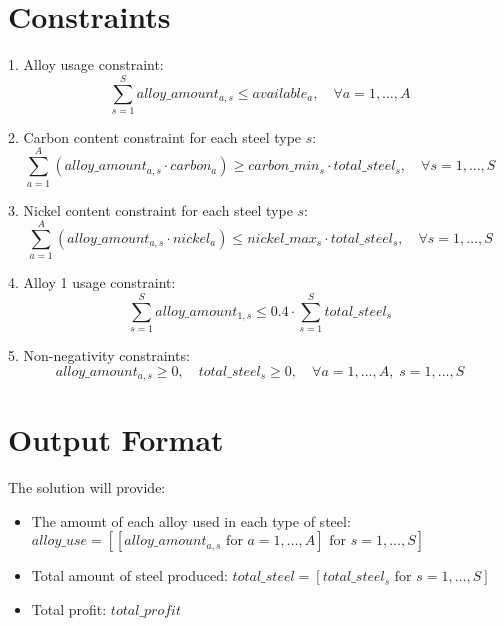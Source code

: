 \documentclass{article}
\begin{document}
\section*{Constraints}

1. Alloy usage constraint:
\[
\sum_{s=1}^{S} alloy\_amount_{a,s} \leq available_{a}, \quad \forall a = 1, \ldots, A
\]

2. Carbon content constraint for each steel type $s$:
\[
\sum_{a=1}^{A} (alloy\_amount_{a,s} \cdot carbon_{a}) \geq carbon\_min_{s} \cdot total\_steel_{s}, \quad \forall s = 1, \ldots, S
\]

3. Nickel content constraint for each steel type $s$:
\[
\sum_{a=1}^{A} (alloy\_amount_{a,s} \cdot nickel_{a}) \leq nickel\_max_{s} \cdot total\_steel_{s}, \quad \forall s = 1, \ldots, S
\]

4. Alloy 1 usage constraint:
\[
\sum_{s=1}^{S} alloy\_amount_{1,s} \leq 0.4 \cdot \sum_{s=1}^{S} total\_steel_{s}
\]

5. Non-negativity constraints:
\[
alloy\_amount_{a,s} \geq 0, \quad total\_steel_{s} \geq 0, \quad \forall a = 1, \ldots, A, \; s = 1, \ldots, S
\]

\section*{Output Format}

The solution will provide:
\begin{itemize}
    \item The amount of each alloy used in each type of steel: $alloy\_use = [[alloy\_amount_{a,s} \text{ for } a = 1, \ldots, A] \text{ for } s = 1, \ldots, S]$
    \item Total amount of steel produced: $total\_steel = [total\_steel_{s} \text{ for } s = 1, \ldots, S]$
    \item Total profit: $total\_profit$
\end{itemize}
\end{document}
